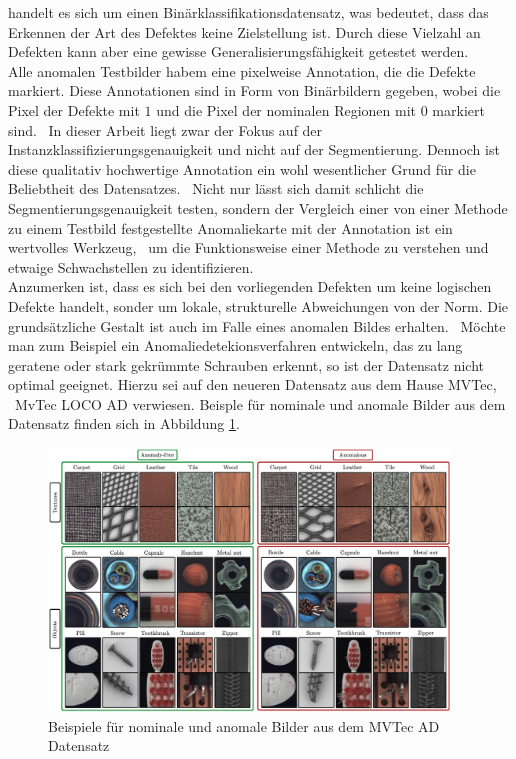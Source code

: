 handelt es sich um einen Binärklassifikationsdatensatz, was bedeutet, dass das Erkennen der Art des Defektes keine Zielstellung ist. Durch diese Vielzahl an Defekten kann aber eine gewisse Generalisierungsfähigkeit getestet werden. \\
Alle anomalen Testbilder habem eine pixelweise Annotation, die die Defekte markiert. Diese Annotationen sind in Form von Binärbildern gegeben, wobei die Pixel der Defekte mit $1$ und die Pixel der nominalen Regionen mit $0$ markiert sind. \
In dieser Arbeit liegt zwar der Fokus auf der Instanzklassifizierungsgenauigkeit und nicht auf der Segmentierung. Dennoch ist diese qualitativ hochwertige Annotation ein wohl wesentlicher Grund für die Beliebtheit des Datensatzes. \
Nicht nur lässt sich damit schlicht die Segmentierungsgenauigkeit testen, sondern der Vergleich einer von einer Methode zu einem Testbild festgestellte Anomaliekarte mit der Annotation ist ein wertvolles Werkzeug, \
um die Funktionsweise einer Methode zu verstehen und etwaige Schwachstellen zu identifizieren. \\
Anzumerken ist, dass es sich bei den vorliegenden Defekten um keine logischen Defekte handelt, sonder um lokale, strukturelle Abweichungen von der Norm. Die grundsätzliche Gestalt ist auch im Falle eines anomalen Bildes erhalten. \ 
Möchte man zum Beispiel ein Anomaliedetekionsverfahren entwickeln, das zu lang geratene oder stark gekrümmte Schrauben erkennt, so ist der Datensatz nicht optimal geeignet. Hierzu sei auf den neueren Datensatz aus dem Hause MVTec, \ 
MvTec LOCO AD verwiesen. \cite{mvtecadloco} Beisple für nominale und anomale Bilder aus dem Datensatz finden sich in Abbildung \ref{fig:mvtecad_examples}. \\
\begin{figure}[h]
  \centering
  \includegraphics[width=0.95\textwidth]{bilder/mvtecad_examples.png}
  \caption{Beispiele für nominale und anomale Bilder aus dem MVTec AD Datensatz}
  \label{fig:mvtecad_examples}
\end{figure}


